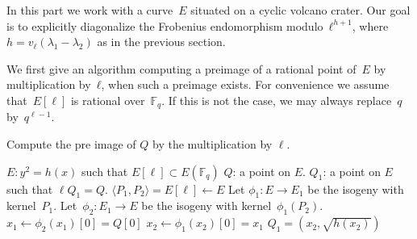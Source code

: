 \documentclass{lms}
\begin{document}
In this part we work with a curve~$E$ situated on a cyclic volcano crater.
Our goal is to explicitly diagonalize the Frobenius endomorphism
modulo~$ℓ^{h+1}$, where~$h = v_{ℓ} (λ_1-λ_2)$ as in the previous section.

We first give an algorithm computing a preimage of a rational point of~$E$
by multiplication by~$ℓ$, when such a preimage exists.
For convenience we assume that~$E[\ell]$ is rational over~$\mathbb{F}_q$.
If this is not the case, we may always replace~$q$ by~$q^{\ell-1}$.
% 

\begin{algorithm}
\caption{\label{ldivision}Compute the pre image of $Q$ by the multiplication by $\ell$.}
\begin{algorithmic}[5]
\REQUIRE  $E: y^2=h(x)$ such that $E[\ell] \subset E(\mathbb{F}_q)$ %
\STATE $Q$: a point on $E$.
\ENSURE $Q_1$: a point on $E$ such that $\ell Q_1 = Q$.
\STATE $ \langle P_1,P_2 \rangle = E[\ell] \gets E $
\STATE Let $\phi_1: E → E_1$ be the isogeny with kernel~$P_1$.
\STATE Let~$\phi_2: E_1 → E$ be the isogeny with kernel~$\phi_1(P_2)$.
\STATE $x_1 \gets \phi_2(x_1)[0]=Q[0] $
\STATE $x_2 \gets \phi_1(x_2)[0]=x_1  $
\RETURN $Q_1 =(x_2,\sqrt{h(x_2)})$
\end{algorithmic}
\end{algorithm}
\end{document}
